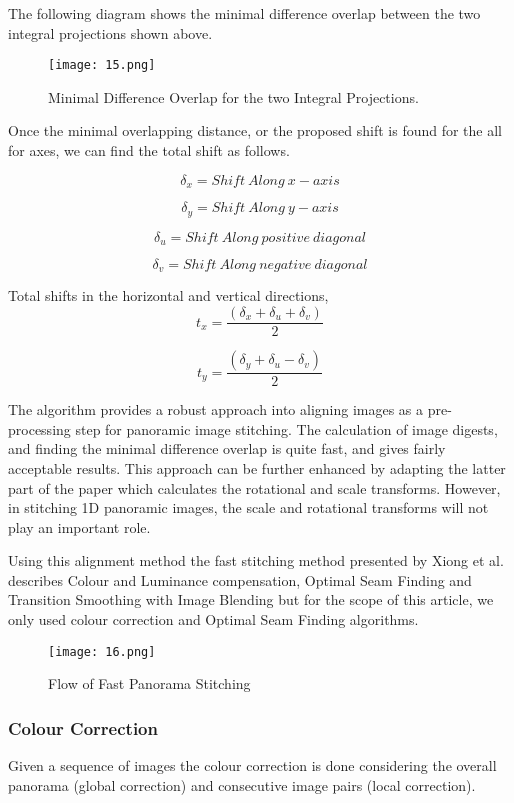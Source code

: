 The following diagram shows the minimal difference overlap between the two integral projections shown above.
\begin{figure}[htbp]
\sidecaption
\texttt{[image: 15.png]}
\caption{Minimal Difference Overlap for the two Integral Projections.}
\label{Fig_2_diff_integrals}       %
\end{figure}

Once the minimal overlapping distance, or the proposed shift is found for the all for axes, we can find the total shift as follows.

\[
{\delta{}}_x=Shift\ Along\ x-axis
\]

\[
{\delta{}}_y=Shift\ Along\ y-axis
\]

\[
{\delta{}}_u=Shift\ Along\ positive\ diagonal
\]

\[
{\delta{}}_v=Shift\ Along\ negative\ diagonal
\]

Total shifts in the horizontal and vertical directions,
\[
t_x=\frac{\left({\delta{}}_x+{\delta{}}_u+{\delta{}}_v\right)}{2}
\]

\[
t_y=\frac{({\delta{}}_y+{\delta{}}_u-{\delta{}}_v)}{2}
\]

The algorithm provides a robust approach into aligning images as a pre-processing step for panoramic image stitching. The calculation of image digests, and finding the minimal difference overlap is quite fast, and gives fairly acceptable results. This approach can be further enhanced by adapting the latter part of the paper which calculates the rotational and scale transforms. However, in stitching 1D panoramic images, the scale and rotational transforms will not play an important role.

Using this alignment method the fast stitching method presented by Xiong et al. describes Colour and Luminance compensation, Optimal Seam Finding and Transition Smoothing with Image Blending but for the scope of this article, we only used colour correction and Optimal Seam Finding algorithms.

\begin{figure}[htbp]
\sidecaption
\texttt{[image: 16.png]}
\caption{Flow of Fast Panorama Stitching}
\label{Fig_2_flow_fast}       %
\end{figure}

\subsubsection{Colour Correction}
Given a sequence of images the colour correction is done considering the overall panorama (global correction) and consecutive image pairs (local correction).

